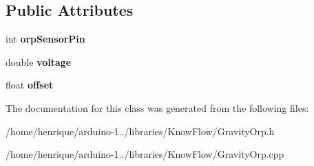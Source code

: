 \subsection*{Public Attributes}
\begin{DoxyCompactItemize}
\item 
int {\bfseries orp\+Sensor\+Pin}\hypertarget{class_gravity_orp_a3c70709c954fdba46ff218ed9084d16f}{}\label{class_gravity_orp_a3c70709c954fdba46ff218ed9084d16f}

\item 
double {\bfseries voltage}\hypertarget{class_gravity_orp_a0d0b0f34cb37014fd144a800388a17af}{}\label{class_gravity_orp_a0d0b0f34cb37014fd144a800388a17af}

\item 
float {\bfseries offset}\hypertarget{class_gravity_orp_a298092950afeb11b7c9e742887cb4b1f}{}\label{class_gravity_orp_a298092950afeb11b7c9e742887cb4b1f}

\end{DoxyCompactItemize}


The documentation for this class was generated from the following files\+:\begin{DoxyCompactItemize}
\item 
/home/henrique/arduino-\/1../libraries/\+Know\+Flow/Gravity\+Orp.\+h\item 
/home/henrique/arduino-\/1../libraries/\+Know\+Flow/Gravity\+Orp.\+cpp\end{DoxyCompactItemize}
